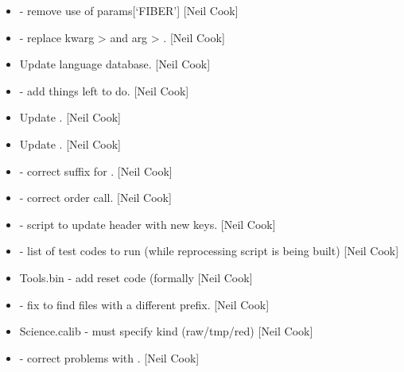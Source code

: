 \documentclass[a4paper,10pt,english]{report}
\begin{document}
\begin{itemize}
\item {} 
 - remove use of params{[}‘FIBER’{]} {[}Neil Cook{]}

\item {} 
 - replace kwarg \textendash{}\textgreater{}  and arg \textendash{}\textgreater{} .
{[}Neil Cook{]}

\item {} 
Update language database. {[}Neil Cook{]}

\item {} 
 - add things left to do. {[}Neil Cook{]}

\item {} 
Update . {[}Neil Cook{]}

\item {} 
Update . {[}Neil Cook{]}

\item {} 
 - correct suffix for
. {[}Neil Cook{]}

\item {} 
 - correct order call. {[}Neil Cook{]}

\item {} 
 - script to update  header with
new keys. {[}Neil Cook{]}

\item {} 
 - list of test codes to run (while
reprocessing script is being built) {[}Neil Cook{]}

\item {} 
Tools.bin - add reset code (formally  {[}Neil Cook{]}

\item {} 
 - fix  to find files with a different
prefix. {[}Neil Cook{]}

\item {} 
Science.calib -  must specify kind (raw/tmp/red)
{[}Neil Cook{]}

\item {} 
 - correct problems with . {[}Neil
Cook{]}


\end{itemize}
\end{document}
